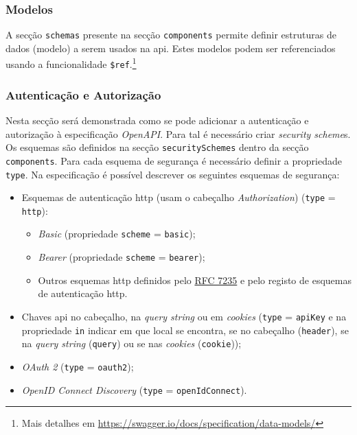 \subsubsection{Modelos}
A secção \texttt{schemas} presente na secção \texttt{components} permite definir estruturas de dados 
(modelo) a serem usados na \acrshort{api}. 
Estes modelos podem ser referenciados usando a funcionalidade \texttt{\$ref}.\footnote{Mais detalhes em \url{https://swagger.io/docs/specification/data-models/}}

\subsubsection{Autenticação e Autorização}\label{sec:authSwagger}
Nesta secção será demonstrada como se pode adicionar a autenticação e autorização à especificação \textit{OpenAPI}. 
Para tal é necessário criar \textit{security scheme}s. Os esquemas são definidos na secção 
\texttt{securitySchemes} dentro da secção \texttt{components}. 
Para cada esquema de segurança é necessário definir a propriedade \texttt{type}. 
Na especificação é possível descrever os seguintes esquemas de segurança:
\begin{itemize}
    \item Esquemas de autenticação \acrshort{http} (usam o cabeçalho \textit{Authorization}) (\texttt{type} = \texttt{http}):
    \begin{itemize}
        \item \textit{Basic} (propriedade \texttt{scheme} = \texttt{basic});
        \item \textit{Bearer} (propriedade \texttt{scheme} = \texttt{bearer});
        \item Outros esquemas \acrshort{http} definidos pelo \href{https://tools.ietf.org/html/rfc7235}{RFC 7235} 
        e pelo registo de esquemas de autenticação \acrshort{http}.
    \end{itemize}
    \item Chaves \acrshort{api} no cabeçalho, na \textit{query string} ou em \textit{cookies} 
    (\texttt{type} = \texttt{apiKey} e na propriedade \texttt{in} indicar em que local se encontra, se no 
    cabeçalho (\texttt{header}), se na \textit{query string} (\texttt{query}) ou se nas \textit{cookies} 
    (\texttt{cookie}));
    \item \textit{OAuth 2} (\texttt{type} = \texttt{oauth2});
    \item \textit{OpenID Connect Discovery} (\texttt{type} = \texttt{openIdConnect}).
\end{itemize}

